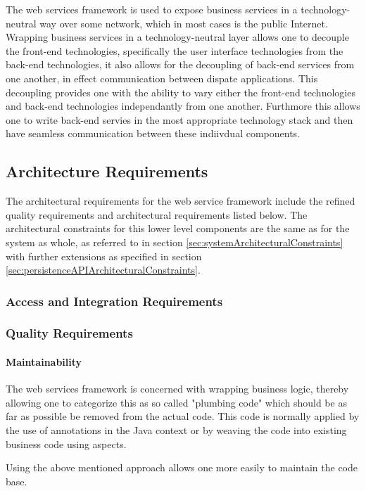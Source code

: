 The web services framework is used to expose business services in a
technology-neutral way over some network, which in most cases is the public
Internet.  Wrapping business services in a technology-neutral layer allows
one to decouple the front-end technologies, specifically the user interface
technologies from the back-end technologies, it also allows for the decoupling
of back-end services from one another, in effect communication between dispate
applications.  This decoupling provides one with the ability to vary either the
front-end technologies and back-end technologies independantly from one
another.  Furthmore this allows one to write back-end servies in the most
appropriate technology stack and then have seamless communication between these
indiivdual components.

\subsection{Architecture Requirements}
The architectural requirements for the web service framework include the
refined quality requirements and architectural requirements listed below. The
architectural constraints for this lower level components are the same as for
the system as whole, as referred to in section \ref{sec:systemArchitecturalConstraints}
with further extensions as specified in section \ref{sec:persistenceAPIArchitecturalConstraints}.

\subsubsection{Access and Integration Requirements}
\subsubsection{Quality Requirements}
\paragraph{Maintainability}
\label{sec:webServicesFrameworkMaintainability}
The web services framework is concerned with wrapping business logic, thereby
allowing one to categorize this as so called "plumbing code" which should be as
far as possible be removed from the actual code. This code is normally applied
by the use of annotations in the Java context or by weaving the code into
existing business code using aspects.

Using the above mentioned approach allows one more easily to maintain the code
base.

